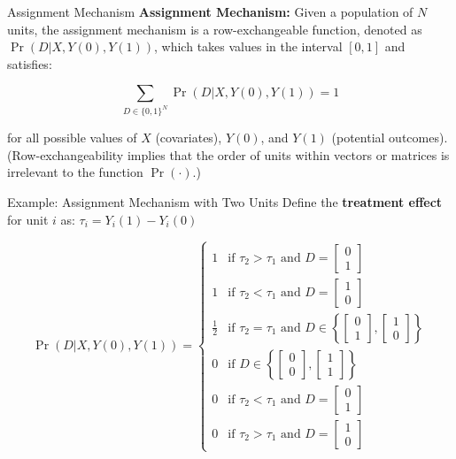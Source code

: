 \documentclass[xcolor=svgnames,t]{beamer}
\begin{document}
\begin{frame}{Assignment Mechanism}
    \textbf{Assignment Mechanism:} Given a population of \( N \) units, the assignment mechanism is a row-exchangeable function, denoted as \( \Pr(D | X, Y(0), Y(1)) \), which takes values in the interval \([0, 1]\) and satisfies:
    
    \[
    \sum_{D \in \{0,1\}^N} \Pr(D | X, Y(0), Y(1)) = 1
    \]

    for all possible values of \( X \) (covariates), \( Y(0) \), and \( Y(1) \) (potential outcomes). (Row-exchangeability implies that the order of units within vectors or matrices is irrelevant to the function \( \Pr(\cdot) \).)
   
\end{frame}

\begin{frame}{Example: Assignment Mechanism with Two Units}
    Define the \textbf{treatment effect} for unit \( i \) as:
    \(
    \tau_i = Y_i(1) - Y_i(0)
    \)

    \[
    \Pr(D | X, Y(0), Y(1)) = 
    \begin{cases} 
      1 & \text{if } \tau_2 > \tau_1 \text{ and } D = \begin{bmatrix} 0 \\ 1 \end{bmatrix} \\[10pt]
      1 & \text{if } \tau_2 < \tau_1 \text{ and } D = \begin{bmatrix} 1 \\ 0 \end{bmatrix} \\[10pt]
      \frac{1}{2} & \text{if } \tau_2 = \tau_1 \text{ and } D \in \left\{ \begin{bmatrix} 0 \\ 1 \end{bmatrix}, \begin{bmatrix} 1 \\ 0 \end{bmatrix} \right\} \\[10pt]
      0 & \text{if } D \in \left\{ \begin{bmatrix} 0 \\ 0 \end{bmatrix}, \begin{bmatrix} 1 \\ 1 \end{bmatrix} \right\} \\[10pt]
      0 & \text{if } \tau_2 < \tau_1 \text{ and } D = \begin{bmatrix} 0 \\ 1 \end{bmatrix} \\[10pt]
      0 & \text{if } \tau_2 > \tau_1 \text{ and } D = \begin{bmatrix} 1 \\ 0 \end{bmatrix}
    \end{cases}
    \]
\end{frame}
\end{document}

